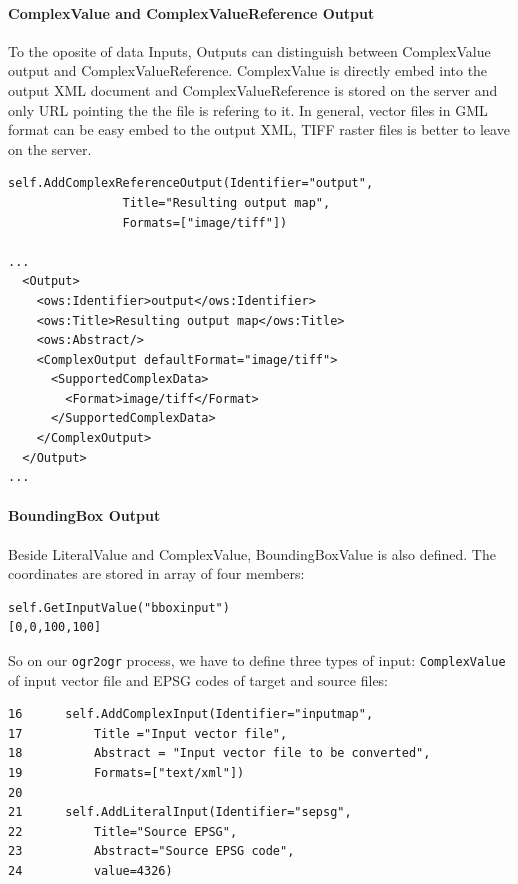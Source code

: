 \documentclass[a4paper,11pt]{article}
\begin{document}
\paragraph{ComplexValue and ComplexValueReference Output}
To the oposite of data Inputs, Outputs can distinguish between ComplexValue
output and ComplexValueReference. ComplexValue is directly embed into the
output XML document and ComplexValueReference is stored on the server and
only URL pointing the the file is refering to it. In general, vector files
in GML format can be easy embed to the output XML, TIFF raster files is
better to leave on the server.

\begin{verbatim}
self.AddComplexReferenceOutput(Identifier="output",
                Title="Resulting output map",
                Formats=["image/tiff"])

...
  <Output>
    <ows:Identifier>output</ows:Identifier>
    <ows:Title>Resulting output map</ows:Title>
    <ows:Abstract/>
    <ComplexOutput defaultFormat="image/tiff">
      <SupportedComplexData>
        <Format>image/tiff</Format>
      </SupportedComplexData>
    </ComplexOutput>
  </Output>
...
\end{verbatim}

\paragraph{BoundingBox Output}
Beside LiteralValue and ComplexValue, BoundingBoxValue is also defined. 
The coordinates are stored in array of four members:

\begin{verbatim}
self.GetInputValue("bboxinput")
[0,0,100,100]
\end{verbatim}

\bigskip

So on our \texttt{ogr2ogr} process, we have to define three types of input:
\texttt{ComplexValue} of input vector file and EPSG codes of target and
source files:

\begin{verbatim}
16      self.AddComplexInput(Identifier="inputmap",
17          Title ="Input vector file",
18          Abstract = "Input vector file to be converted",
19          Formats=["text/xml"])
20
21      self.AddLiteralInput(Identifier="sepsg",
22          Title="Source EPSG",
23          Abstract="Source EPSG code",
24          value=4326) 
\end{verbatim}
\end{document}
